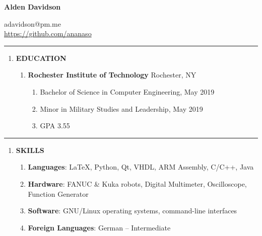 \documentclass[11pt]{article}
\begin{document}
\begin{center}
\begin{minipage}[b]{0.70\textwidth}
	{\Huge\textbf{Alden Davidson}}
\end{minipage}%
\begin{minipage}[b]{0.30\textwidth}
	\raggedleft
	adavidson@pm.me\\
    \url{https://github.com/ananaso}
\end{minipage}
\end{center}
\textcolor{black!60}{\rule{\textwidth}{3pt}}
\begin{center}
\begin{enumerate}[label={}, leftmargin=0pt]
    \item {\Large \textbf{EDUCATION}}
    \begin{enumerate}[label={}]
        \item \textbf{Rochester Institute of Technology} \textbar{} Rochester, NY\\
        \begin{enumerate}[label={--}]
            \item Bachelor of Science in Computer Engineering, May 2019\\
            \item Minor in Military Studies and Leadership, May 2019\\
            \item GPA 3.55
        \end{enumerate}
    \end{enumerate}
\end{enumerate}
\end{center}
\textcolor{black!20}{\rule{\textwidth}{3pt}}
\begin{center}
\begin{enumerate}[label={}, leftmargin=0pt]
    \item {\Large \textbf{SKILLS}}
    \begin{enumerate}[label={}]
        \item \textbf{Languages}: \LaTeX, Python, Qt, VHDL, ARM Assembly, C/C++, Java\\
        \item \textbf{Hardware}: FANUC \& Kuka robots, Digital Multimeter, Oscilloscope, Function Generator\\
        \item \textbf{Software}: GNU/Linux operating systems, command-line interfaces\\
        \item \textbf{Foreign Languages}: German -- Intermediate
    \end{enumerate}
\end{enumerate}
\end{center}
\end{document}
